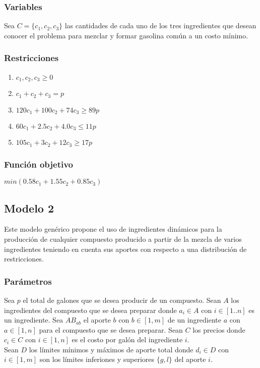 \documentclass{article}
\begin{document}
\subsubsection{Variables}
Sea $C=\{c_1,c_2,c_3\}$ las cantidades de cada uno de los tres ingredientes que desean conocer el problema para mezclar y formar gasolina común a un costo mínimo.
\subsubsection{Restricciones}
\begin{enumerate}
    \item $c_1,c_2,c_3 \geq 0$
    \item $c_1+c_2+c_3=p$
    \item $120c_1+100c_2+74c_3\geq 89p$
    \item $60c_1+2.5c_2+4.0c_3\leq 11p$
    \item $105c_1+3c_2+12c_3\geq 17p$
\end{enumerate}
\subsubsection{Función objetivo}
$min(0.58c_1+1.55c_2+0.85c_3)$

\subsection{Modelo 2}
Este modelo genérico propone el uso de ingredientes dinámicos para la producción de cualquier compuesto producido a partir de la mezcla de varios ingredientes teniendo en cuenta sus aportes con respecto a una distribución de restricciones.\\

\subsubsection{Parámetros}
Sea $p$ el total de galones que se desea producir de un compuesto. Sean $A$ los ingredientes del compuesto que se desea preparar donde $a_i \in A$ con $i \in [1..n]$ es un ingrediente. Sea $AB_{ab}$ el aporte $b$ con $b \in [1,m]$ de un ingrediente $a$ con $a \in [1,n]$ para el compuesto que se desea preparar. Sean $C$ los precios donde $c_i \in C$ con $i \in [1,n]$ es el costo por galón del ingrediente $i$.\\

Sean $D$ los límites mínimos y máximos de aporte total donde $d_i \in D$ con $i \in [1,m]$ son los límites inferiones y superiores $\{g,l\}$ del aporte $i$.\\
\end{document}

